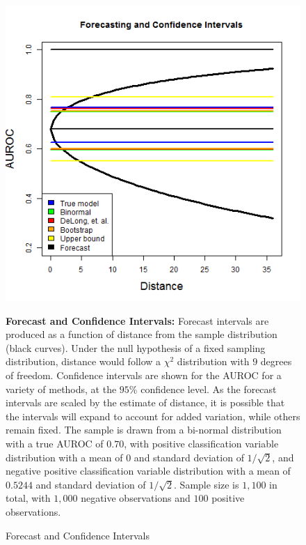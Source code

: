 


\begin{figure}[h!]

\begin{center}

    \caption{Forecast and Confidence Intervals} \label{fig:Forecast1}

        \includegraphics[scale=  0.75]{Figs/Forecast/Forecast_int_1.png}



\end{center}

    \footnotesize

        \textbf{Forecast and Confidence Intervals:}
        Forecast intervals are produced as a function of distance from the sample distribution (black curves).
        Under the null hypothesis of a fixed sampling distribution, distance would follow a $\chi^2$ distribution with $9$ degrees of freedom.
        Confidence intervals are shown for the AUROC for a variety of methods, at the $95\%$ confidence level.
        As the forecast intervals are scaled by the estimate of distance, it is possible that the intervals will expand to account for added variation, while others remain fixed. 
        The sample is drawn from a bi-normal distribution with a true AUROC of $0.70$, with positive classification variable distribution with a mean of $0$ and standard deviation of $1/\sqrt{2}$, and negative positive classification variable distribution with a mean of $0.5244$ and standard deviation of $1/\sqrt{2}$.
        Sample size is $1,100$ in total, with $1,000$ negative observations and $100$ positive observations.


\end{figure}



